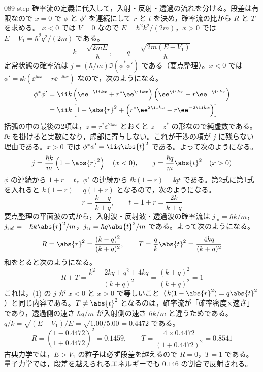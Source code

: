 \documentclass[uplatex,dvipdfmx,a4paper,11pt]{jsarticle}
\begin{document}
\kaitouhen
{}
\begin{kaisetsu}{089-step}
\houshin 確率流の定義に代入して，入射・反射・透過の流れを分ける。段差は有限なので $x=0$ で $\phi$ と $\phi'$ を連続にして $r$ と $t$ を決め，確率流の比から $R$ と $T$ を求める。
\keisan
{} $x<0$ では $V=0$ なので $E=\hbar^{2}k^{2}/(2m)$，$x>0$ では $E-V_{1}=\hbar^{2}q^{2}/(2m)$ である。
\[ k=\frac{\sqrt{2mE}}{\hbar},\qquad q=\frac{\sqrt{2m(E-V_{1})}}{\hbar} \]
定常状態の確率流は $j=(\hbar/m)\Im(\phi^{*}\phi')$ である（要点整理）。$x<0$ では $\phi'=\ii k(\ee^{\ii kx}-r\ee^{-\ii kx})$ なので，次のようになる。
\begin{align*}
\phi^{*}\phi'&=\ii k\left(\ee^{-\ii kx}+r^{*}\ee^{\ii kx}\right)\left(\ee^{\ii kx}-r\ee^{-\ii kx}\right)\\
&=\ii k\left[1-\abs{r}^{2}+\left(r^{*}\ee^{2\ii kx}-r\ee^{-2\ii kx}\right)\right]
\end{align*}
括弧の中の最後の2項は，$z=r^{*}\ee^{2\ii kx}$ とおくと $z-z^{*}$ の形なので純虚数である。$\ii k$ を掛けると実数になり，虚部に寄与しない。これが干渉の項が $j$ に残らない理由である。$x>0$ では $\phi^{*}\phi'=\ii q\abs{t}^{2}$ である。よって次のようになる。
\[ j=\frac{\hbar k}{m}\left(1-\abs{r}^{2}\right)\quad(x<0),\qquad j=\frac{\hbar q}{m}\abs{t}^{2}\quad(x>0) \]
 $\phi$ の連続から $1+r=t$，$\phi'$ の連続から $\ii k(1-r)=\ii qt$ である。第2式に第1式を入れると $k(1-r)=q(1+r)$ となるので，次のようになる。
\[ r=\frac{k-q}{k+q},\qquad t=1+r=\frac{2k}{k+q} \]
 要点整理の平面波の式から，入射波・反射波・透過波の確率流は $j_{\mathrm{in}}=\hbar k/m$，$j_{\mathrm{ref}}=-\hbar k\abs{r}^{2}/m$，$j_{\mathrm{tr}}=\hbar q\abs{t}^{2}/m$ である。よって次のようになる。
\[ R=\abs{r}^{2}=\frac{(k-q)^{2}}{(k+q)^{2}},\qquad T=\frac{q}{k}\abs{t}^{2}=\frac{4kq}{(k+q)^{2}} \]
和をとると次のようになる。
\[ R+T=\frac{k^{2}-2kq+q^{2}+4kq}{(k+q)^{2}}=\frac{(k+q)^{2}}{(k+q)^{2}}=1 \]
これは，(1) の $j$ が $x<0$ と $x>0$ で等しいこと（$k(1-\abs{r}^{2})=q\abs{t}^{2}$）と同じ内容である。$T\ne\abs{t}^{2}$ となるのは，確率流が「確率密度×速さ」であり，透過側の速さ $\hbar q/m$ が入射側の速さ $\hbar k/m$ と違うためである。
 $q/k=\sqrt{(E-V_{1})/E}=\sqrt{1.00/5.00}=\num{0.4472}$ である。
\[ R=\left(\frac{1-\num{0.4472}}{1+\num{0.4472}}\right)^{2}=\num{0.1459},\qquad T=\frac{4\times\num{0.4472}}{(1+\num{0.4472})^{2}}=\num{0.8541} \]
古典力学では，$E>V_{1}$ の粒子は必ず段差を越えるので $R=0$，$T=1$ である。量子力学では，段差を越えられるエネルギーでも $\num{0.146}$ の割合で反射される。

\end{kaisetsu}
\end{document}
